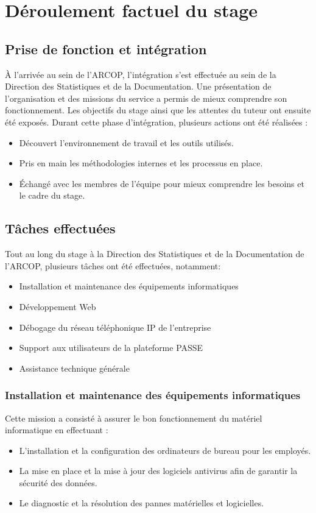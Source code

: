 \chapter{Déroulement factuel du stage}
\clearpage


\section{ Prise de fonction et intégration}
À l'arrivée au sein de l'ARCOP, l'intégration s'est effectuée au sein de la Direction des Statistiques et de la Documentation. Une présentation de l'organisation et des missions du service a permis de mieux comprendre son fonctionnement. Les objectifs du stage ainsi que les attentes du tuteur ont ensuite été exposés.
Durant cette phase d'intégration, plusieurs actions ont été réalisées :

\begin{itemize}
    \item Découvert l'environnement de travail et les outils utilisés.
    \item Pris en main les méthodologies internes et les processus en place.
    \item Échangé avec les membres de l'équipe pour mieux comprendre les besoins et le cadre du stage.

\end{itemize}
\section{Tâches effectuées}
Tout au long du stage à la Direction des Statistiques et de la Documentation de l'ARCOP, plusieurs tâches ont été effectuées, notamment:
\begin{itemize}
    \item Installation et maintenance des équipements informatiques
    \item Développement Web
    \item Débogage du réseau téléphonique IP de l'entreprise 
    \item Support aux utilisateurs de la plateforme PASSE
    \item Assistance technique générale    
\end{itemize} 
\subsection{Installation et maintenance des équipements informatiques}
Cette mission a consisté à assurer le bon fonctionnement du matériel informatique en effectuant :
\begin{itemize}
    \item L’installation et la configuration des ordinateurs de bureau pour les employés.

    \item La mise en place et la mise à jour des logiciels antivirus afin de garantir la sécurité des données.
    \item Le diagnostic et la résolution des pannes matérielles et logicielles.
\end{itemize}
